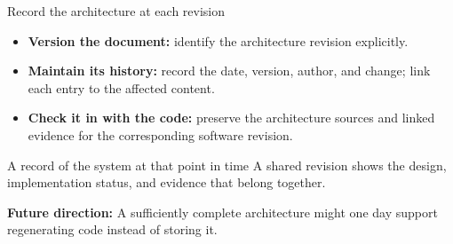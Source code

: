 \begin{frame}{Record the architecture at each revision}
\begin{itemize}
  \item \textbf{Version the document:} identify the architecture revision explicitly.
  \item \textbf{Maintain its history:} record the date, version, author, and change; link each entry to the affected content.
  \item \textbf{Check it in with the code:} preserve the architecture sources and linked evidence for the corresponding software revision.
\end{itemize}
\vspace{0.2cm}
\begin{slidecallout}{A record of the system at that point in time}
A shared revision shows the design, implementation status, and evidence that belong together.
\end{slidecallout}
\vspace{0.12cm}
{\small\textbf{Future direction:} A sufficiently complete architecture might one day support regenerating code instead of storing it.}
\end{frame}
